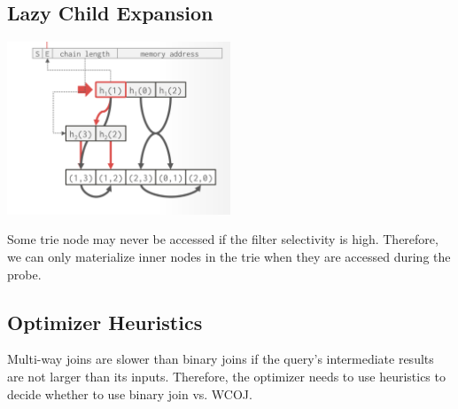 \documentclass[11pt]{article}
\begin{document}
\subsection{Lazy Child Expansion}


\begin{center}
    \includegraphics[width=0.5\textwidth]{img/figure6.png}
\end{center}

Some trie node may never be accessed if the filter selectivity is high. Therefore, we can only materialize inner nodes in the trie when they are accessed during the probe.\cite{freitag2020adopting}

\subsection{Optimizer Heuristics}

Multi-way joins are slower than binary joins if the query's intermediate results are not larger than its inputs.
Therefore, the optimizer needs to use heuristics to decide whether to use binary join vs. WCOJ.

\newpage


\end{document}
